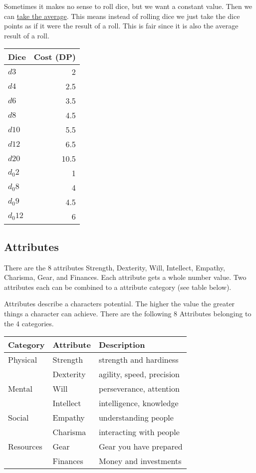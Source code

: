 \documentclass[11pt]{article}
\begin{document}
{Sometimes it makes no sense to roll dice, but we want a constant value. Then we can \hyperref[sec:org67312b7]{take the average}. This means instead of rolling dice we just take the dice points as if it were the result of a roll. This is fair since it is also the average result of a roll.

\begin{center}
\begin{tabular}{lr}
Dice & Cost (DP)\\
\hline
\(d3\) & 2\\
\(d4\) & 2.5\\
\(d6\) & 3.5\\
\(d8\) & 4.5\\
\(d10\) & 5.5\\
\(d12\) & 6.5\\
\(d20\) & 10.5\\
\(d_0 2\) & 1\\
\(d_0 8\) & 4\\
\(d_0 9\) & 4.5\\
\(d_0 12\) & 6\\
\end{tabular}
\end{center}
\subsection{Attributes}
\label{sec:orgcd0fde3}
\begin{short}
There are the 8 attributes Strength, Dexterity, Will, Intellect, Empathy, Charisma, Gear, and Finances. Each attribute gets a whole number value.
Two attributes each can be combined to a attribute category (see table below).
\end{short}

Attributes describe a characters potential. The higher the value the greater things a character can achieve. There are the following 8 Attributes belonging to the 4 categories.

\begin{center}
\begin{tabular}{lll}
\textbf{Category} & \textbf{Attribute} & \textbf{Description}\\
\hline
Physical & Strength & strength and hardiness\\
 & Dexterity & agility, speed, precision\\
\hline
Mental & Will & perseverance, attention\\
 & Intellect & intelligence, knowledge\\
\hline
Social & Empathy & understanding people\\
 & Charisma & interacting with people\\
\hline
Resources & Gear & Gear you have prepared\\
 & Finances & Money and investments\\
\end{tabular}
\end{center}

}
\end{document}
